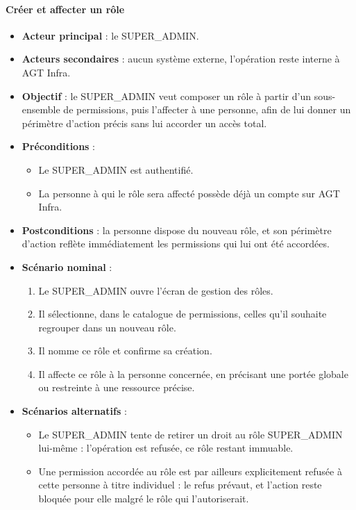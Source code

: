 \paragraph{Créer et affecter un rôle}
\begin{itemize}
  \item \textbf{Acteur principal} : le SUPER\_ADMIN.
  \item \textbf{Acteurs secondaires} : aucun système externe, l'opération
        reste interne à AGT Infra.
  \item \textbf{Objectif} : le SUPER\_ADMIN veut composer un rôle à partir
        d'un sous-ensemble de permissions, puis l'affecter à une personne,
        afin de lui donner un périmètre d'action précis sans lui accorder
        un accès total.
  \item \textbf{Préconditions} :
        \begin{itemize}
          \item Le SUPER\_ADMIN est authentifié.
          \item La personne à qui le rôle sera affecté possède déjà un
                compte sur AGT Infra.
        \end{itemize}
  \item \textbf{Postconditions} : la personne dispose du nouveau rôle, et
        son périmètre d'action reflète immédiatement les permissions qui
        lui ont été accordées.
  \item \textbf{Scénario nominal} :
        \begin{enumerate}
          \item Le SUPER\_ADMIN ouvre l'écran de gestion des rôles.
          \item Il sélectionne, dans le catalogue de permissions, celles
                qu'il souhaite regrouper dans un nouveau rôle.
          \item Il nomme ce rôle et confirme sa création.
          \item Il affecte ce rôle à la personne concernée, en précisant
                une portée globale ou restreinte à une ressource précise.
        \end{enumerate}
  \item \textbf{Scénarios alternatifs} :
        \begin{itemize}
          \item Le SUPER\_ADMIN tente de retirer un droit au rôle
                SUPER\_ADMIN lui-même : l'opération est refusée, ce rôle
                restant immuable.
          \item Une permission accordée au rôle est par ailleurs
                explicitement refusée à cette personne à titre individuel :
                le refus prévaut, et l'action reste bloquée pour elle
                malgré le rôle qui l'autoriserait.
        \end{itemize}
\end{itemize}

